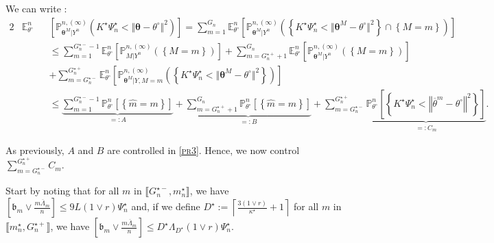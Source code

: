 We can write :
\begin{alignat*}{2}
& \mathds{E}_{\theta^{\circ}}^{n} && \left[\mathds{P}_{\boldsymbol{\theta}^{M}\vert Y^{n}}^{n, (\infty)}\left(K^{\star} \Psi_{n}^{\star} < \Vert \boldsymbol{\theta} - \theta^{\circ} \Vert ^{2}\right)\right] = \sum\limits_{m = 1}^{G_{n}} \mathds{E}_{\theta^{\circ}}^{n}\left[\mathds{P}_{\boldsymbol{\theta}^{M} \vert Y^{n}}^{n, (\infty)}\left(\left\{K^{\star} \Psi_{n}^{\star} < \Vert \boldsymbol{\theta}^{M} - \theta^{\circ} \Vert^{2}\right\} \cap \left\{M = m\right\}\right)\right]\\
& && \leq \sum\limits_{m = 1}^{G_{n}^{\star-} - 1} \mathds{E}_{\theta^{\circ}}^{n}\left[\mathds{P}_{M \vert Y^{n}}^{n, (\infty)}\left(\left\{M = m\right\}\right)\right] + \sum\limits_{m = G_{n}^{\star+} + 1}^{G_{n}} \mathds{E}_{\theta^{\circ}}^{n}\left[\mathds{P}_{\boldsymbol{\theta}^{M} \vert Y^{n}}^{n, (\infty)}\left(\left\{M = m\right\}\right)\right]\\
& && + \sum\limits_{m = G_{n}^{\star-}}^{G_{n}^{\star+}} \mathds{E}_{\theta^{\circ}}^{n}\left[\mathds{P}_{\boldsymbol{\theta}^{M}\vert Y, M = m}^{n, (\infty)}\left(\left\{K^{\star} \Psi_{n}^{\star} < \Vert \boldsymbol{\theta}^{M} - \theta^{\circ} \Vert^{2}\right\}\right)\right]\\
& && \leq \underbrace{\sum\limits_{m = 1}^{G_{n}^{\star-} - 1} \mathds{P}_{\theta^{\circ}}^{n}\left[\left\{\widehat{m} = m\right\}\right]}_{=: A} + \underbrace{\sum\limits_{m = G_{n}^{\star+} + 1}^{G_{n}} \mathds{P}_{\theta^{\circ}}^{n}\left[\left\{\widehat{m} = m\right\}\right]}_{=: B} + \sum\limits_{m = G_{n}^{\star-}}^{G_{n}^{\star+}} \underbrace{\mathds{P}_{\theta^{\circ}}^{n}\left[\left\{K^{\star} \Psi_{n}^{\star} < \left\Vert \overline{\theta}^{m} - \theta^{\circ} \right\Vert^{2}\right\}\right]}_{=: C_{m}}.
\end{alignat*}

\medskip

As previously, $A$ and $B$ are controlled in \textsc{\cref{pr3}}.
Hence, we now control $\sum\limits_{m = G_{n}^{\star-}}^{G_{n}^{\star+}} C_{m}.$

\medskip

Start by noting that for all $m$ in $\llbracket G_{n}^{\star-}, m_{n}^{\star} \rrbracket$, we have $\left[\mathfrak{b}_{m} \vee \frac{m \overline{\Lambda}_{m}}{n}\right] \leq 9 L \left(1 \vee r\right) \Psi_{n}^{\star}$ and, if we define $D^{\star} := \left\lceil \frac{3 \left(1 \vee r\right)}{\kappa^{\star}} + 1\right\rceil$ for all $m$ in $\llbracket m_{n}^{\star}, G_{n}^{\star+} \rrbracket$, we have $\left[\mathfrak{b}_{m} \vee \frac{m \overline{\Lambda}_{m}}{n}\right] \leq D^{\star} \Lambda_{D^{\star}} \left( 1 \vee r\right) \Psi_{n}^{\star}$.

